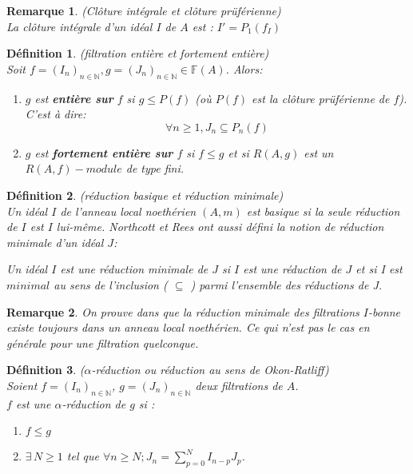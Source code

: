 \documentclass[12pt, a4paper, oneside]{article}
\newtheorem{maremarque}{Remarque}
\newtheorem{madefinition}{Définition}
\begin{document}
	\begin{maremarque} (Clôture intégrale et clôture prüférienne) \\
		La clôture intégrale d'un idéal $I$ de $A$ est : $I'=P_1(f_I)$
	\end{maremarque}
	\begin{madefinition}(filtration entière et fortement entière)\\
		Soit $f=(I_n)_{n \in \mathbb{N}} , g = (J_n)_{n \in \mathbb{N}}\in \mathbb{F}(A)$.  Alors:\\
		\begin{enumerate}
			\item[(a)]$g$ est \textbf{entière sur} $f$ si $g \leqslant P(f)$ (où $P(f)$ est la clôture prüférienne de $f$). C'est à dire:
			\[\forall n \geqslant 1, J_n \subseteq P_{n}(f) \]
			\item[(b)]$g$ est \textbf{fortement entière sur} $f$ si $f \leqslant g$ et si $R(A,g)$ est un $R(A,f)-module$ de type fini.
		\end{enumerate}
	\end{madefinition}
	\begin{madefinition} (réduction basique et réduction minimale) \\
		Un idéal $I$ de l'anneau local noethérien $(A,m)$ est basique si la seule réduction de $I$ est $I$ lui-m\^{e}me. 
		Northcott et Rees ont aussi défini la notion de réduction minimale
		d'un idéal $J$:
		
		Un idéal $I$ est une réduction minimale de $J$ si $I$ est une réduction de $J$ et si I est $minimal$ au sens de l'inclusion ( $\subseteq$ ) parmi l'ensemble des réductions de J. 
	\end{madefinition}
	\begin{maremarque}
		On prouve dans \cite{Di2} que la réduction minimale des filtrations $I$-bonne existe toujours dans un anneau local noethérien. Ce qui n'est pas le cas en générale pour une filtration quelconque.
	\end{maremarque}
	\begin{madefinition}($\alpha$-réduction ou réduction au sens de Okon-Ratliff)\\
		Soient $f=(I_n)_{n \in \mathbb{N}}$, $g=(J_n)_{n \in \mathbb{N}}$ deux filtrations de $A$.\\
		$f$ est une $\alpha$-réduction de $g$ si : \\
		\begin{enumerate}
			\item[i)] $f \leq g$
			\item[ii)] $\exists \, N \geq 1$ tel que $\forall n \geq N ; J_n = \displaystyle \sum_{p=0}^{N}{I_{n-p} J_p}$.
		\end{enumerate}
	\end{madefinition}
\end{document}
